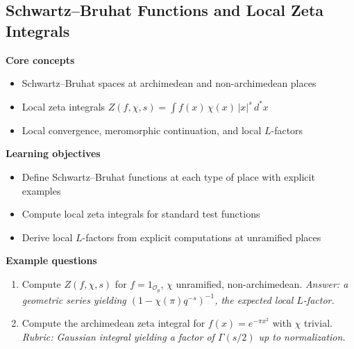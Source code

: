 \documentclass[11pt]{article}
\begin{document}
\subsection{Schwartz--Bruhat Functions and Local Zeta Integrals}
\textbf{Core concepts}
\begin{itemize}[noitemsep]
  \item Schwartz--Bruhat spaces at archimedean and non-archimedean places
  \item Local zeta integrals $Z(f,\chi,s) = \int f(x)\,\chi(x)\,|x|^s\, d^*x$
  \item Local convergence, meromorphic continuation, and local $L$-factors
\end{itemize}
\textbf{Learning objectives}
\begin{itemize}[noitemsep]
  \item Define Schwartz--Bruhat functions at each type of place with explicit examples
  \item Compute local zeta integrals for standard test functions
  \item Derive local $L$-factors from explicit computations at unramified places
\end{itemize}
\textbf{Example questions}
\begin{enumerate}[noitemsep]
  \item[Q1 (foundational).] Compute $Z(f,\chi,s)$ for $f = 1_{\mathcal{O}_p}$, $\chi$ unramified, non-archimedean. \emph{Answer: a geometric series yielding $(1-\chi(\pi)q^{-s})^{-1}$, the expected local $L$-factor.}
  \item[Q2 (advanced).] Compute the archimedean zeta integral for $f(x)=e^{-\pi x^2}$ with $\chi$ trivial. \emph{Rubric: Gaussian integral yielding a factor of $\Gamma(s/2)$ up to normalization.}
\end{enumerate}

\end{document}
